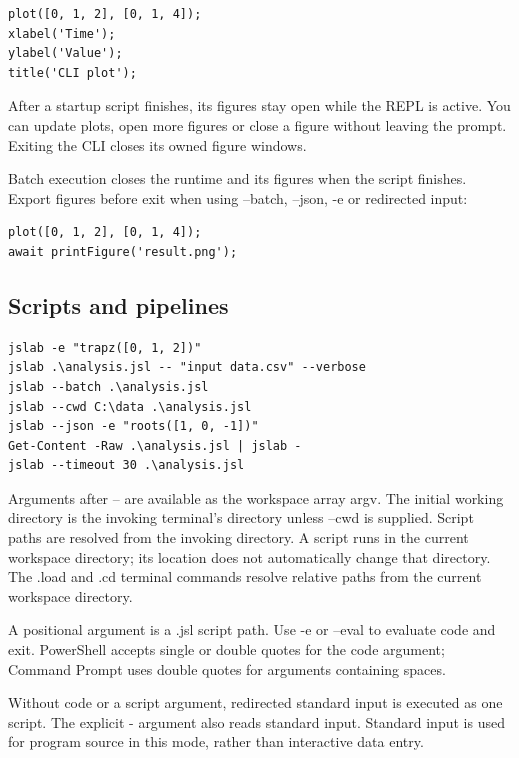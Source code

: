 \documentclass[12pt,a4paper]{article}
\begin{document}
\begin{lstlisting}[style=JavaScriptStyle,language={}]
plot([0, 1, 2], [0, 1, 4]);
xlabel('Time');
ylabel('Value');
title('CLI plot');
\end{lstlisting}

After a startup script finishes, its figures stay open while the REPL is active. You can update plots, open more figures or close a figure without leaving the prompt. Exiting the CLI closes its owned figure windows.

Batch execution closes the runtime and its figures when the script finishes. Export figures before exit when using --batch, --json, -e or redirected input:

\begin{lstlisting}[style=JavaScriptStyle,language={}]
plot([0, 1, 2], [0, 1, 4]);
await printFigure('result.png');
\end{lstlisting}


\subsection{Scripts and pipelines}

\begin{lstlisting}[style=JavaScriptStyle,language={}]
jslab -e "trapz([0, 1, 2])"
jslab .\analysis.jsl -- "input data.csv" --verbose
jslab --batch .\analysis.jsl
jslab --cwd C:\data .\analysis.jsl
jslab --json -e "roots([1, 0, -1])"
Get-Content -Raw .\analysis.jsl | jslab -
jslab --timeout 30 .\analysis.jsl
\end{lstlisting}

Arguments after -- are available as the workspace array argv. The initial working directory is the invoking terminal's directory unless --cwd is supplied. Script paths are resolved from the invoking directory. A script runs in the current workspace directory; its location does not automatically change that directory. The .load and .cd terminal commands resolve relative paths from the current workspace directory.

A positional argument is a .jsl script path. Use -e or --eval to evaluate code and exit. PowerShell accepts single or double quotes for the code argument; Command Prompt uses double quotes for arguments containing spaces.

Without code or a script argument, redirected standard input is executed as one script. The explicit - argument also reads standard input. Standard input is used for program source in this mode, rather than interactive data entry.
\end{document}
